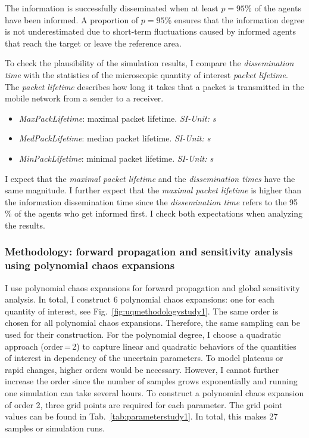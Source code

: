 The information is successfully disseminated when at least $p=95$\% of the agents have been informed. A proportion of $p=95$\% ensures that the information degree is not underestimated due to short-term fluctuations caused by informed agents that reach the target or leave the reference area.

To check the plausibility of the simulation results, I compare the \textit{dissemination time} with the statistics of the microscopic quantity of interest \textit{packet lifetime}. The  \textit{packet lifetime} describes how long it takes that a packet is transmitted in the mobile network from a sender to a receiver.  %

\begin{itemize}
\item \textit{MaxPackLifetime}: maximal packet lifetime. \textit{SI-Unit: s}
\item \textit{MedPackLifetime}: median packet lifetime. \textit{SI-Unit: s}
\item \textit{MinPackLifetime}: minimal packet lifetime. \textit{SI-Unit: s}
\end{itemize}

I expect that the \textit{maximal packet lifetime} and the \textit{dissemination times} have the same magnitude. I further expect that the \textit{maximal packet lifetime} is higher than the information dissemination time since the \textit{dissemination time} refers to the 95\,\% of the agents who get informed first. I check both expectations when analyzing the results.



\subsubsection{Methodology: forward propagation and sensitivity analysis using polynomial chaos expansions}
I use polynomial chaos expansions for forward propagation and global sensitivity analysis. In total, I construct 6 polynomial chaos expansions: one for each quantity of interest, see Fig.~\ref{fig:uqmethodologystudy1}. The same order is chosen for all polynomial chaos expansions. Therefore, the same sampling can be used for their construction.
For the polynomial degree, I choose a quadratic approach (order\,=\,2) to capture linear and quadratic behaviors of the quantities of interest in dependency of the uncertain parameters. To model plateaus or rapid changes, higher orders would be necessary. However, I cannot further increase the order since the number of samples grows exponentially and running one simulation can take several hours.  To construct a polynomial chaos expansion of order 2, three grid points are required for each parameter. The grid point values can be found in Tab.~\ref{tab:parameterstudy1}. In total, this makes 27 samples or simulation runs. 

